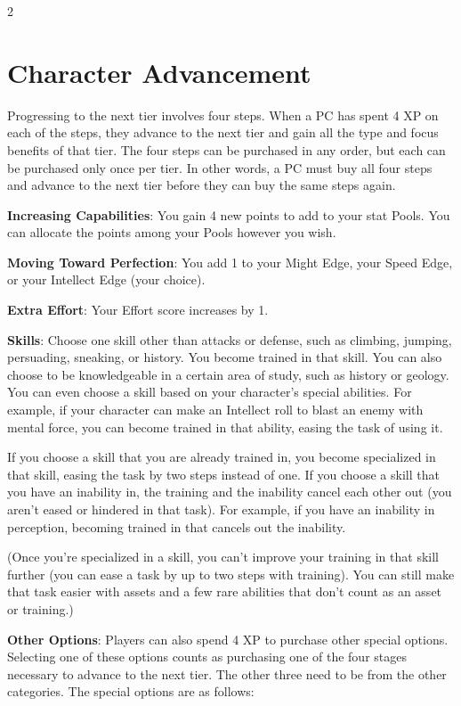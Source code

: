 \begin{multicols}{2}

\chapter{Character Advancement}

Progressing to the next tier involves four steps. When a PC has spent 4 XP on each of the steps, they advance to the next tier and gain all the type and focus benefits of that tier. The four steps can be purchased in any order, but each can be purchased only once per tier. In other words, a PC must buy all four steps and advance to the next tier before they can buy the same steps again.

\textbf{Increasing Capabilities}: You gain 4 new points to add to your stat Pools. You can allocate the points among your Pools however you wish.

\textbf{Moving Toward Perfection}: You add 1 to your Might Edge, your Speed Edge, or your Intellect Edge (your choice).

\textbf{Extra Effort}: Your Effort score increases by 1.

\textbf{Skills}: Choose one skill other than attacks or defense, such as climbing, jumping, persuading, sneaking, or history. You become trained in that skill. You can also choose to be knowledgeable in a certain area of study, such as history or geology. You can even choose a skill based on your character’s special abilities. For example, if your character can make an Intellect roll to blast an enemy with mental force, you can become trained in that ability, easing the task of using it.

If you choose a skill that you are already trained in, you become specialized in that skill, easing the task by two steps instead of one. If you choose a skill that you have an inability in, the training and the inability cancel each other out (you aren’t eased or hindered in that task). For example, if you have an inability in perception, becoming trained in that cancels out the inability.

(Once you’re specialized in a skill, you can’t improve your training in that skill further (you can ease a task by up to two steps with training). You can still make that task easier with assets and a few rare abilities that don’t count as an asset or training.)

\textbf{Other Options}: Players can also spend 4 XP to purchase other special options. Selecting one of these options counts as purchasing one of the four stages necessary to advance to the next tier. The other three need to be from the other categories. The special options are as follows:


\end{multicols}
